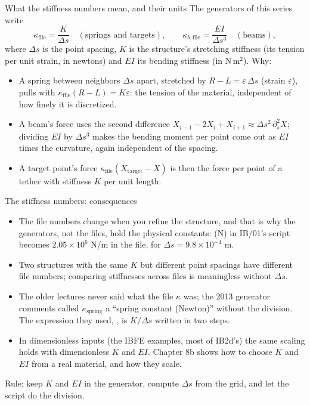 \documentclass[aspectratio=169,11pt]{beamer}
\begin{document}
\begin{frame}{What the stiffness numbers mean, and their units}
\small The generators of this series write
\[
\kappa_{\text{file}} = \frac{K}{\Delta s} \quad(\text{springs and targets}), \qquad
\kappa_{b,\text{file}} = \frac{EI}{\Delta s^3} \quad(\text{beams}),
\]
where $\Delta s$ is the point spacing, $K$ is the structure's stretching stiffness (its tension per unit strain, in newtons) and $EI$ its bending stiffness (in N\,m$^2$). Why:
\begin{itemize}
  \item A spring between neighbors $\Delta s$ apart, stretched by $R - L = \varepsilon\,\Delta s$ (strain $\varepsilon$), pulls with $\kappa_{\text{file}}(R - L) = K\varepsilon$: the tension of the material, independent of how finely it is discretized.
  \item A beam's force uses the second difference $X_{i-1} - 2X_i + X_{i+1} \approx \Delta s^2\,\partial_s^2 X$; dividing $EI$ by $\Delta s^3$ makes the bending moment per point come out as $EI$ times the curvature, again independent of the spacing.
  \item A target point's force $\kappa_{\text{file}}(X_{\text{target}} - X)$ is then the force per point of a tether with stiffness $K$ per unit length.
\end{itemize}
\end{frame}

\begin{frame}{The stiffness numbers: consequences}
\begin{itemize}
  \item The file numbers change when you refine the structure, and that is why the generators, not the files, hold the physical constants:  (N) in IB/01's script becomes $2.05\times10^6$ N/m in the file, for $\Delta s = 9.8\times10^{-4}$ m.
  \item Two structures with the same $K$ but different point spacings have different file numbers; comparing stiffnesses across files is meaningless without $\Delta s$.
  \item The older lectures never said what the file $\kappa$ was; the 2013 generator comments called $\kappa_{\text{spring}}$ a ``spring constant (Newton)'' without the division. The expression they used, , is $K/\Delta s$ written in two steps.
  \item In dimensionless inputs (the IBFE examples, most of IB2d's) the same scaling holds with dimensionless $K$ and $EI$. Chapter 8b shows how to choose $K$ and $EI$ from a real material, and how they scale.
\end{itemize}
\vspace{2mm}
\begin{punchbox}
\small Rule: keep $K$ and $EI$ in the generator, compute $\Delta s$ from the grid, and let the script do the division.
\end{punchbox}
\end{frame}
\end{document}
